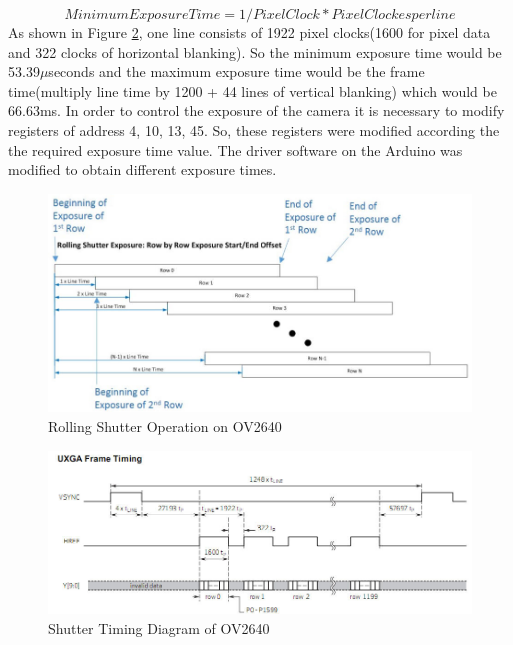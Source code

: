 $$
Minimum Exposure Time = 1/Pixel Clock * Pixel Clockes per line 
$$
As shown in Figure \ref{fig:ShutterTimingOV2640}, one line consists of 1922 pixel clocks(1600 for pixel data and 322 clocks of horizontal blanking). So the minimum exposure time would be 53.39$\mu$seconds and the maximum exposure time would be the frame time(multiply line time by 1200 + 44 lines of vertical blanking) which would be 66.63ms\cite{RollingShutterOV2640}. In order to control the exposure of the camera it is necessary to modify registers of address 4, 10, 13, 45. So, these registers were modified according the the required exposure time value. The driver software on the Arduino was modified to obtain different exposure times.
\begin{figure}[ht]
\includegraphics[width=\textwidth]{pics/rolling_shutter}
\caption{Rolling Shutter Operation on OV2640\cite{RollingShutterOV2640}}
\label{fig:RollingShutterOV2640}
\end{figure}

\begin{figure}[ht]
\includegraphics[width=\textwidth]{pics/OV2640timing}
\caption{Shutter Timing Diagram of OV2640\cite{RollingShutterOV2640}}
\label{fig:ShutterTimingOV2640}
\end{figure}

